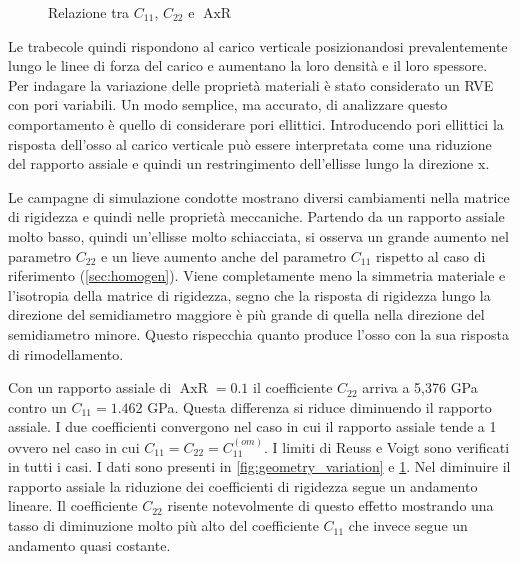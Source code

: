 \documentclass[a4paper,num-refs]{oup-contemporary}
\begin{document}
\label{sec:variazione_simmetria}

\begin{figure}[bt!] %

	\centering
	\def\svgwidth{0.9\linewidth}
	
	\caption{Relazione tra $C_{11}$, $C_{22}$ e $\operatorname{AxR}$ }
	\label{fig:geometric_variation}
\end{figure}





Le trabecole quindi rispondono al carico verticale posizionandosi prevalentemente lungo le linee di forza del carico e aumentano la loro densità e il loro spessore. Per indagare la variazione delle proprietà materiali è stato considerato un RVE con pori variabili. Un modo semplice, ma accurato, di analizzare questo comportamento è quello di considerare pori ellittici. Introducendo pori ellittici la risposta dell'osso al carico verticale può essere interpretata come una riduzione del rapporto assiale e quindi un restringimento dell'ellisse lungo la direzione x. 

Le campagne di simulazione condotte mostrano diversi cambiamenti nella matrice di rigidezza e quindi nelle proprietà meccaniche. Partendo da un rapporto assiale molto basso, quindi un'ellisse molto schiacciata, si osserva un grande aumento nel parametro $C_{22}$ e un lieve aumento anche del parametro $C_{11}$ rispetto al caso di riferimento (\cref{sec:homogen}). Viene completamente meno la simmetria materiale e l'isotropia della matrice di rigidezza, segno che la risposta di rigidezza lungo la direzione del semidiametro maggiore è più grande di quella nella direzione del semidiametro minore. Questo rispecchia quanto produce l'osso con la sua risposta di rimodellamento. 

Con un rapporto assiale di $\operatorname{AxR}=0.1$ il coefficiente $C_{22}$ arriva a 5,376 GPa contro un $C_{11}=1.462$ GPa. Questa differenza si riduce diminuendo il rapporto assiale. I due coefficienti convergono nel caso in cui il rapporto assiale tende a 1 ovvero nel caso in cui $C_{11}=C_{22}=C_{11}^{(om)}$. I limiti di Reuss e Voigt sono verificati in tutti i casi. I dati sono presenti in \cref{fig:geometry_variation} e \cref{fig:geometric_variation}. Nel diminuire il rapporto assiale la riduzione dei coefficienti di rigidezza segue un andamento lineare. Il coefficiente $C_{22}$ risente notevolmente di questo effetto mostrando una tasso di diminuzione molto più alto del coefficiente $C_{11}$ che invece segue un andamento quasi costante. 
\end{document}
